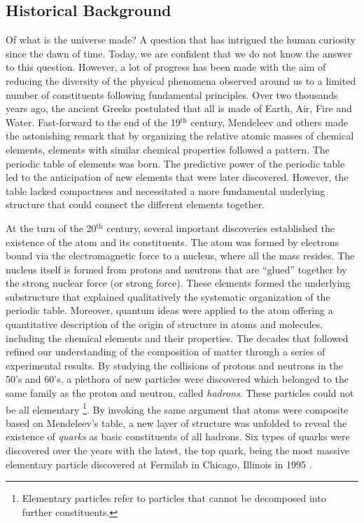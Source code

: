 \subsection*{Historical Background}

Of what is the universe made? A question that has intrigued the human curiosity since the dawn of time. 
Today, we are confident that we do not know the answer to this question.
However, a lot of progress has been made with the aim of reducing the diversity of the physical phenomena 
observed around us to a limited number of constituents following fundamental principles.
Over two thousands years ago, the ancient Greeks  postulated that all is made of Earth, Air, Fire and Water.
Fast-forward to the end of the 19$^\text{th}$ century, Mendeleev and others made the astonishing remark that by organizing the 
relative atomic masses of chemical elements, elements with similar chemical properties followed a pattern.
The periodic table of elements was born. 
The predictive power of the periodic table led to the anticipation of new elements that were later discovered.
However, the table lacked compactness and necessitated a more fundamental underlying structure that could 
connect the different elements together. 

At the turn of the 20$^\text{th}$ century, several important discoveries established 
the existence of the atom and its constituents. 
The atom was formed by electrons bound via the electromagnetic force to a nucleus, where all the mass resides.
The nucleus itself is formed from 
protons and neutrons that are ``glued'' together by the strong nuclear force (or strong force).
These elements formed the underlying substructure that explained qualitatively the systematic organization of the periodic table.
Moreover, quantum ideas were applied to the atom offering a quantitative description of the origin of structure in atoms and molecules, 
including the chemical elements and their properties.
The decades that followed refined our understanding of the composition of matter through a series of experimental results.
By studying the collisions of protons and neutrons in the 50's and 60's, a plethora of new particles were discovered 
which belonged to the same family as the proton and neutron, called \textit{hadrons}. %
These particles could not be all elementary
\footnote{Elementary particles refer to  particles that cannot be decomposed into further constituents.}.
By invoking the same argument that atoms were composite based on Mendeleev's table,
a new layer of structure was unfolded to reveal the existence of \textit{quarks} as basic constituents of all hadrons.
Six types of quarks were discovered over the years with the latest, the top quark, being the most massive elementary particle 
discovered at Fermilab in Chicago, Illinois in 1995 \cite{PhysRevLett.74.2626,Abachi:1995iq}.

